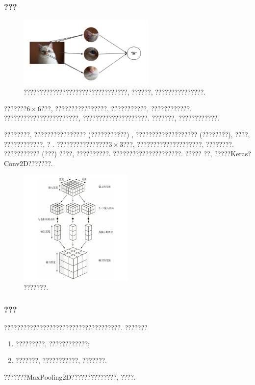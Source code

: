 \documentclass[lang=cn,11pt]{elegantpaper}
\begin{document}
\subsubsection*{???}
\tiny
\begin{figure}[htbp]
	\centering
  \includegraphics[width=0.6\textwidth]{cat1}
  \caption{????????????????????????????????, ??????, ???????????????.\label{fig:cat1}}
\end{figure}

\normalsize
???????$6\times 6$???, ????????????????, ???????????, ????????????. ???????????????????????, ????????????????????. ???????, ????????????. 

????????, ???????????????? (???????????) , ??????????????????? (????????), ????, ????????????, ? . 
????????????????$3\times 3$???, ????????????????????, ????????. ??????????? (???) ????, ??????????. ?????????????????????. ?????  ??, ?????Keras?Conv2D???????. 
\begin{figure}[htbp]
	\centering
  \includegraphics[width=0.5\textwidth]{conv1.png}
  \caption{???????.\label{fig:conv1}}
\end{figure}

\subsubsection*{???}
????????????????????????????????????. ???????
\begin{enumerate}
	\item ?????????, ????????????; 
	\item ???????, ???????????, ???????.
\end{enumerate}
???????MaxPooling2D??????????????, ????. 
\end{document}
